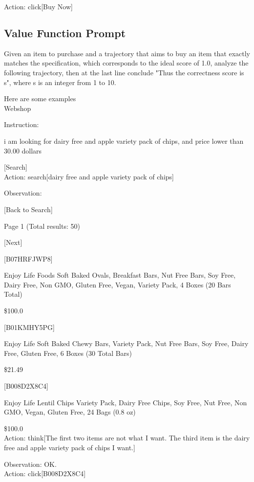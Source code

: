 \documentclass{article} \usepackage{iclr2024_conference,times}
\begin{document}
Action: click[Buy Now]

\subsection{Value Function Prompt}

Given an item to purchase and a trajectory that aims to buy an item that exactly matches the specification, which corresponds to the ideal score of 1.0, analyze the following trajectory, then at the last line conclude "Thus the correctness score is {s}", where s is an integer from 1 to 10.

Here are some examples
\\

Webshop

Instruction:

i am looking for dairy free and apple variety pack of chips, and price lower than 30.00 dollars

[Search]
\\

Action: search[dairy free and apple variety pack of chips]

Observation:

[Back to Search]

Page 1 (Total results: 50)

[Next]

[B07HRFJWP8]

Enjoy Life Foods Soft Baked Ovals, Breakfast Bars, Nut Free Bars, Soy Free, Dairy Free, Non GMO, Gluten Free, Vegan, Variety Pack, 4 Boxes (20 Bars Total)

\$100.0

[B01KMHY5PG]

Enjoy Life Soft Baked Chewy Bars, Variety Pack, Nut Free Bars, Soy Free, Dairy Free, Gluten Free, 6 Boxes (30 Total Bars)

\$21.49

[B008D2X8C4]

Enjoy Life Lentil Chips Variety Pack, Dairy Free Chips, Soy Free, Nut Free, Non GMO, Vegan, Gluten Free, 24 Bags (0.8 oz)

\$100.0
\\

Action: think[The first two items are not what I want. The third item is the dairy free and apple variety pack of chips I want.]

Observation: OK.
\\

Action: click[B008D2X8C4]
\end{document}
